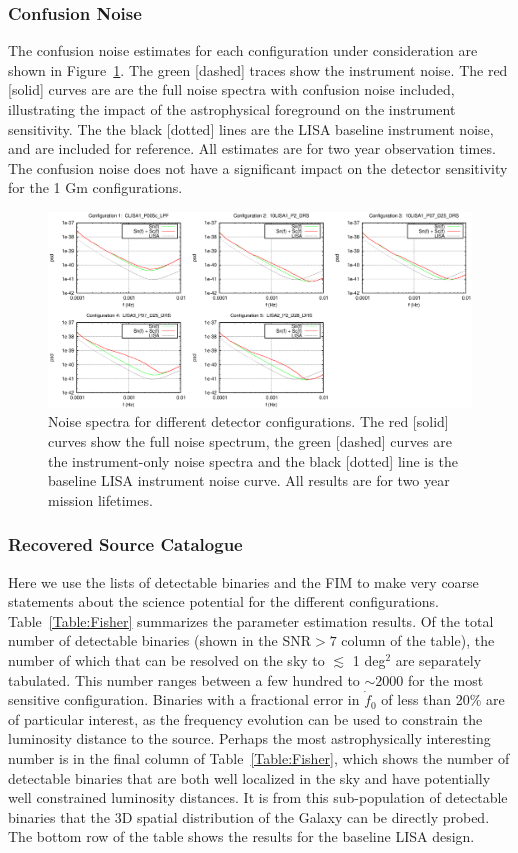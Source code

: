 \documentclass{iopart}
\begin{document}
\subsubsection{Confusion Noise}
The confusion noise estimates for each configuration under consideration are shown in Figure~\ref{Figure:Confusion}.  The green [dashed] traces show the instrument noise.  The red [solid] curves are are the full noise spectra with confusion noise included, illustrating the impact of the astrophysical foreground on the instrument sensitivity.  The the black [dotted] lines are 
the LISA baseline instrument noise, and are included for reference.  All estimates are for two year observation 
times.  The confusion noise does not have a significant impact on the detector sensitivity for the 1 Gm configurations.
\begin{figure}[H]
   \includegraphics[width=1\textwidth]{confusion.eps} %
   \caption{Noise spectra for different detector configurations.  The red [solid] curves show the full noise spectrum, the green [dashed] curves are the instrument-only noise spectra and the black [dotted] line is the baseline LISA instrument noise curve.  All results are for two year mission lifetimes. }
   \label{Figure:Confusion}
\end{figure}

\subsubsection{Recovered Source Catalogue}
Here we use the lists of detectable binaries and the FIM to make very coarse statements about the science potential for the 
different configurations.  Table~\ref{Table:Fisher} summarizes the parameter estimation results.  Of the total number of 
detectable binaries (shown in the SNR$>7$ column of the table), the number of which that can be resolved on the sky to 
$\lesssim$ 1 deg$^2$ are separately tabulated.  This number ranges between a few hundred to $\sim 2000$ for the most sensitive configuration.  Binaries with a fractional error in $\dot{f}_0$ of less than 20\% are of particular interest, as the 
frequency evolution can be used to constrain the luminosity distance to the source.  Perhaps the most astrophysically 
interesting number is in the final column of Table~\ref{Table:Fisher}, which shows the number of detectable binaries that are 
both well localized in the sky and have potentially well constrained luminosity distances.  It is from this sub-population of 
detectable binaries that the 3D spatial distribution of the Galaxy can be directly probed.  The bottom row of the table shows 
the results for the baseline LISA design.
\end{document}
